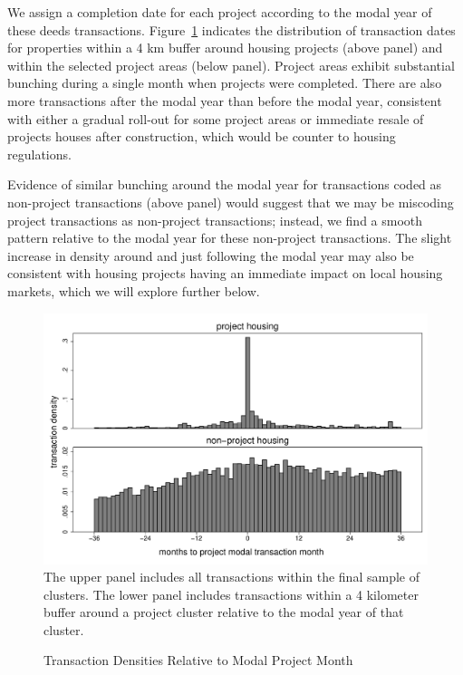 \documentclass[12pt]{article}
\begin{document}
We assign a completion date for each project according to the modal year of these deeds transactions.  Figure~\ref{figure:densitytime} indicates the distribution of transaction dates for properties within a 4 km buffer around housing projects (above panel) and within the selected project areas (below panel).  Project areas exhibit substantial bunching during a single month when projects were completed.  There are also more transactions after the modal year than before the modal year, consistent with either a gradual roll-out for some project areas or immediate resale of projects houses after construction, which would be counter to housing regulations.  

Evidence of similar bunching around the modal year for transactions coded as non-project transactions (above panel) would suggest that we may be miscoding project transactions as non-project transactions; instead, we find a smooth pattern relative to the modal year for these non-project transactions.  The slight increase in density around and just following the modal year may also be consistent with housing projects having an immediate impact on local housing markets, which we will explore further below.

\begin{figure}
\caption{Transaction Densities Relative to Modal Project Month}\label{figure:densitytime}
\centering
\includegraphics[scale=.5]{figures/summary_densitytime.pdf} \\
The upper panel includes all transactions within the final sample of clusters.  The lower panel includes transactions within a 4 kilometer buffer around a project cluster relative to the modal year of that cluster.
\end{figure}
\end{document}
